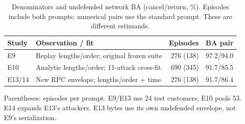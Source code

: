 \begin{table}[t]\centering\footnotesize
\caption{Denominators and undefended network BA (cancel/return, \%). Episodes include both prompts; numerical pairs use the standard prompt. These are different estimands.}\label{tab:r7-cohorts}
\begin{tabularx}{\columnwidth}{@{}lYrr@{}}\toprule
Study & Observation / fit & Episodes & BA pair\\\midrule
E9 & Replay lengths/order; original frozen suite & 276 (138) & 97.2/94.0\\
E10 & Analytic lengths/order; 11-attack cross-fit & 690 (345) & 91.7/85.5\\
E13/14 & New RPC envelope; lengths/order + time & 276 (138) & 91.7/86.4\\\bottomrule
\end{tabularx}
\par\smallskip\raggedright Parentheses: episodes per prompt. E9/E13 use 24 test customers; E10 pools 53. E14 expands E13's attackers. E13 bytes use its own undefended envelope, not E9's serialization.
\end{table}
